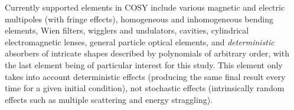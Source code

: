 \documentclass{jacow}
\begin{document}

Currently supported elements in COSY include various magnetic and electric multipoles (with fringe effects), homogeneous and inhomogeneous bending elements, Wien filters, wigglers and undulators, cavities, cylindrical electromagnetic lenses, general particle optical elements, and \emph{deterministic} absorbers of intricate shapes described by polynomials of arbitrary order, with the last element being of particular interest for this study. This element only takes into account deterministic effects (producing the same final result every time for a given initial condition), not stochastic effects (intrinsically random effects such as multiple scattering and energy straggling).
\end{document}
